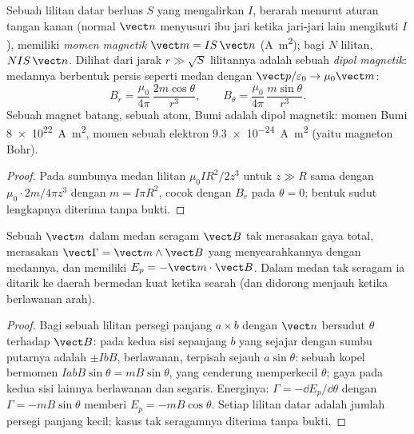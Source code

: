 \begin{definition}\label{def:b1:magnetostatics:moment}
Sebuah lilitan datar berluas $S$ yang mengalirkan $I$, berarah menurut aturan tangan kanan
(normal $\vect n$ menyusuri ibu jari ketika jari-jari lain mengikuti $I$), memiliki
\emph{momen magnetik} $\vect m = IS\,\vect n$ (\unit{A.m^2}); bagi $N$
lilitan, $NIS\,\vect n$. Dilihat dari jarak $r \gg \sqrt S$ lilitannya adalah sebuah
\emph{dipol magnetik}: medannya berbentuk persis seperti medan  dengan $\vect p/\varepsilon_0 \to \mu_0\vect m$:
\[
B_r = \frac{\mu_0}{4\pi}\,\frac{2m\cos\theta}{r^3}, \qquad
B_\theta = \frac{\mu_0}{4\pi}\,\frac{m\sin\theta}{r^3} .
\]
Sebuah magnet batang, sebuah atom, Bumi adalah dipol magnetik: momen
Bumi \qty{8e22}{A.m^2}, momen sebuah elektron \qty{9.3e-24}{A.m^2} (yaitu
magneton Bohr).
\end{definition}

\begin{proof}
Pada sumbunya medan lilitan $\mu_0IR^2/2z^3$ untuk $z \gg R$ sama dengan
$\mu_0 \cdot 2m/4\pi z^3$ dengan $m = I\pi R^2$, cocok dengan $B_r$ pada $\theta = 0$;
bentuk sudut lengkapnya diterima tanpa bukti.
\end{proof}

\begin{theorem}\label{thm:b1:magnetostatics:dipoleinfield}
Sebuah  $\vect m$ dalam medan seragam $\vect B$ tak merasakan
gaya total, merasakan  $\vect\Gamma = \vect m\wedge\vect B$ yang menyearahkannya
dengan medannya, dan memiliki  $E_p = -\vect m\cdot\vect B$. Dalam
medan tak seragam ia ditarik ke daerah bermedan kuat ketika
searah (dan didorong menjauh ketika berlawanan arah).
\end{theorem}

\begin{proof}
Bagi sebuah lilitan persegi panjang $a \times b$ dengan $\vect n$ bersudut $\theta$ terhadap
$\vect B$:  pada kedua sisi sepanjang $b$ yang sejajar dengan
sumbu putarnya adalah $\pm IbB$, berlawanan, terpisah sejauh $a\sin\theta$:
sebuah kopel bermomen $IabB\sin\theta = mB\sin\theta$, yang cenderung
memperkecil $\theta$; gaya pada kedua sisi lainnya berlawanan dan
segaris. Energinya: $\Gamma = -\dd E_p/\dd\theta$ dengan $\Gamma = -mB\sin\theta$
memberi $E_p = -mB\cos\theta$. Setiap lilitan datar adalah jumlah persegi panjang kecil;
kasus tak seragamnya diterima tanpa bukti.
\end{proof}

